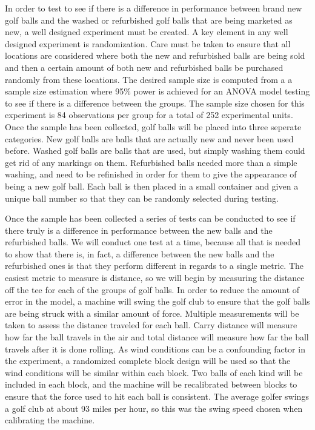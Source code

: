 \documentclass{article}\usepackage[]{graphicx}\usepackage[]{color}
\begin{document}
In order to test to see if there is a difference in performance between brand new golf balls and the washed or refurbished golf balls that are being marketed as new, a well designed experiment must be created. A key element in any well designed experiment is randomization. Care must be taken to ensure that all locations are considered where both the new and refurbished balls are being sold and then a certain amount of both new and refurbished balls be purchased randomly from these locations. The desired sample size is computed from a a sample size estimation where 95\% power is achieved for an ANOVA model testing to see if there is a difference between the groups. The sample size chosen for this experiment is 84 observations per group for a total of 252 experimental units. Once the sample has been collected, golf balls will be placed into three seperate categories. New golf balls are balls that are actually new and never been used before. Washed golf balls are balls that are used, but simply washing them could get rid of any markings on them. Refurbished balls needed more than a simple washing, and need to be refinished in order for them to give the appearance of being a new golf ball. Each ball is then placed in a small container and given a unique ball number so that they can be randomly selected during testing.

Once the sample has been collected a series of tests can be conducted to see if there truly is a difference in performance between the new balls and the refurbished balls. We will conduct one test at a time, because all that is needed to show that there is, in fact, a difference between the new balls and the refurbished ones is that they perform different in regards to a single metric. The easiest metric to measure is distance, so we will begin by measuring the distance off the tee for each of the groups of golf balls. In order to reduce the amount of error in the model, a machine will swing the golf club to ensure that the golf balls are being struck with a similar amount of force. Multiple measurements will be taken to assess the distance traveled for each ball. Carry distance will measure how far the ball travels in the air and total distance will measure how far the ball travels after it is done rolling. As wind conditions can be a confounding factor in the experiment, a randomized complete block design will be used so that the wind conditions will be similar within each block. Two balls of each kind will be included in each block, and the machine will be recalibrated between blocks to ensure that the force used to hit each ball is consistent. The average golfer swings a golf club at about 93 miles per hour, so this was the swing speed chosen when calibrating the machine.
\end{document}
